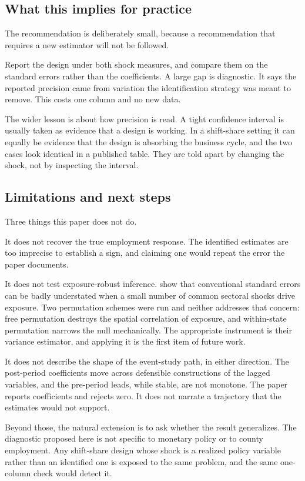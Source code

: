 \subsection*{What this implies for practice}

The recommendation is deliberately small, because a recommendation that requires
a new estimator will not be followed.

Report the design under both shock measures, and compare them on the standard
errors rather than the coefficients. A large gap is diagnostic. It says the
reported precision came from variation the identification strategy was meant to
remove. This costs one column and no new data.

The wider lesson is about how precision is read. A tight confidence interval is
usually taken as evidence that a design is working. In a shift-share setting it
can equally be evidence that the design is absorbing the business cycle, and the
two cases look identical in a published table. They are told apart by changing
the shock, not by inspecting the interval.

\subsection*{Limitations and next steps}

Three things this paper does not do.

It does not recover the true employment response. The identified estimates are
too imprecise to establish a sign, and claiming one would repeat the error the
paper documents.

It does not test exposure-robust inference. \citet{adao2019} show that
conventional standard errors can be badly understated when a small number of
common sectoral shocks drive exposure. Two permutation schemes were run and
neither addresses that concern: free permutation destroys the spatial
correlation of exposure, and within-state permutation narrows the null
mechanically. The appropriate instrument is their variance estimator, and
applying it is the first item of future work.

It does not describe the shape of the event-study path, in either direction.
The post-period coefficients move across defensible constructions of the lagged
variables, and the pre-period leads, while stable, are not monotone. The paper
reports coefficients and rejects zero. It does not narrate a trajectory that the
estimates would not support.

Beyond those, the natural extension is to ask whether the result generalizes.
The diagnostic proposed here is not specific to monetary policy or to county
employment. Any shift-share design whose shock is a realized policy variable
rather than an identified one is exposed to the same problem, and the same
one-column check would detect it.
